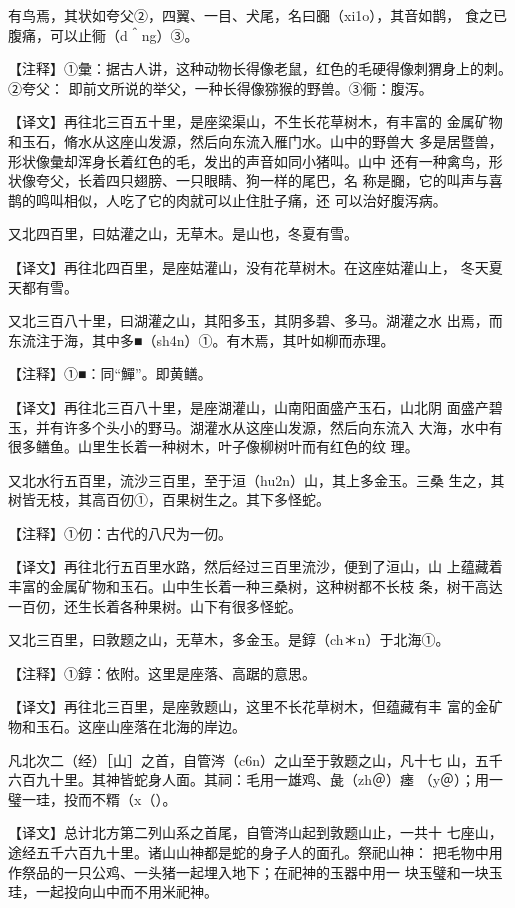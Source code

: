 \documentclass[a4paper,12pt,UTF8,twoside]{ctexbook}
\begin{document}
有鸟焉，其状如夸父②，四翼、一目、犬尾，名曰嚻（xi1o），其音如鹊， 食之已腹痛，可以止衕（d＾ng）③。

【注释】①彙：据古人讲，这种动物长得像老鼠，红色的毛硬得像刺猬身上的刺。②夸父： 即前文所说的举父，一种长得像猕猴的野兽。③衕：腹泻。

【译文】再往北三百五十里，是座梁渠山，不生长花草树木，有丰富的 金属矿物和玉石，脩水从这座山发源，然后向东流入雁门水。山中的野兽大 多是居暨兽，形状像彙却浑身长着红色的毛，发出的声音如同小猪叫。山中 还有一种禽鸟，形状像夸父，长着四只翅膀、一只眼睛、狗一样的尾巴，名 称是嚻，它的叫声与喜鹊的鸣叫相似，人吃了它的肉就可以止住肚子痛，还 可以治好腹泻病。

又北四百里，曰姑灌之山，无草木。是山也，冬夏有雪。

【译文】再往北四百里，是座姑灌山，没有花草树木。在这座姑灌山上， 冬天夏天都有雪。

又北三百八十里，曰湖灌之山，其阳多玉，其阴多碧、多马。湖灌之水 出焉，而东流注于海，其中多■（sh4n）①。有木焉，其叶如柳而赤理。

【注释】①■：同“鱓”。即黄鳝。

【译文】再往北三百八十里，是座湖灌山，山南阳面盛产玉石，山北阴 面盛产碧玉，并有许多个头小的野马。湖灌水从这座山发源，然后向东流入 大海，水中有很多鳝鱼。山里生长着一种树木，叶子像柳树叶而有红色的纹 理。

又北水行五百里，流沙三百里，至于洹（hu2n）山，其上多金玉。三桑 生之，其树皆无枝，其高百仞①，百果树生之。其下多怪蛇。

【注释】①仞：古代的八尺为一仞。

【译文】再往北行五百里水路，然后经过三百里流沙，便到了洹山，山 上蕴藏着丰富的金属矿物和玉石。山中生长着一种三桑树，这种树都不长枝 条，树干高达一百仞，还生长着各种果树。山下有很多怪蛇。

又北三百里，曰敦题之山，无草木，多金玉。是錞（ch＊n）于北海①。

【注释】①錞：依附。这里是座落、高踞的意思。

【译文】再往北三百里，是座敦题山，这里不长花草树木，但蕴藏有丰 富的金矿物和玉石。这座山座落在北海的岸边。

凡北次二（经）［山］之首，自管涔（c6n）之山至于敦题之山，凡十七 山，五千六百九十里。其神皆蛇身人面。其祠：毛用一雄鸡、彘（zh＠）瘗 （y＠）；用一璧一珪，投而不糈（x（）。

【译文】总计北方第二列山系之首尾，自管涔山起到敦题山止，一共十 七座山，途经五千六百九十里。诸山山神都是蛇的身子人的面孔。祭祀山神： 把毛物中用作祭品的一只公鸡、一头猪一起埋入地下；在祀神的玉器中用一 块玉璧和一块玉珪，一起投向山中而不用米祀神。
\end{document}
